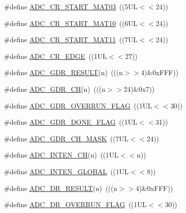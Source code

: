 \begin{DoxyCompactItemize}
\item 
\#define \hyperlink{group___a_d_c___private___macros_ga61d62f698ffa3c9772e1bea985f47e62}{\-A\-D\-C\-\_\-\-C\-R\-\_\-\-S\-T\-A\-R\-T\-\_\-\-M\-A\-T03}~((5\-U\-L$<$$<$24))
\item 
\#define \hyperlink{group___a_d_c___private___macros_ga1a95007f7fa04b41528857b1f8e065da}{\-A\-D\-C\-\_\-\-C\-R\-\_\-\-S\-T\-A\-R\-T\-\_\-\-M\-A\-T10}~((6\-U\-L$<$$<$24))
\item 
\#define \hyperlink{group___a_d_c___private___macros_gac4a508f05c04a51d3af94ab0f1686716}{\-A\-D\-C\-\_\-\-C\-R\-\_\-\-S\-T\-A\-R\-T\-\_\-\-M\-A\-T11}~((7\-U\-L$<$$<$24))
\item 
\#define \hyperlink{group___a_d_c___private___macros_ga1d05d43234dd2d1489841dff0012225e}{\-A\-D\-C\-\_\-\-C\-R\-\_\-\-E\-D\-G\-E}~((1\-U\-L$<$$<$27))
\item 
\#define \hyperlink{group___a_d_c___private___macros_ga3f3911f930878b532604b661686fdca0}{\-A\-D\-C\-\_\-\-G\-D\-R\-\_\-\-R\-E\-S\-U\-L\-T}(n)~(((n$>$$>$4)\&0x\-F\-F\-F))
\item 
\#define \hyperlink{group___a_d_c___private___macros_ga64132bfe8cebfb3b482e8f1f4ff721d7}{\-A\-D\-C\-\_\-\-G\-D\-R\-\_\-\-C\-H}(n)~(((n$>$$>$24)\&0x7))
\item 
\#define \hyperlink{group___a_d_c___private___macros_ga58a2d5a6e2743223c42a06d3f842d2cc}{\-A\-D\-C\-\_\-\-G\-D\-R\-\_\-\-O\-V\-E\-R\-R\-U\-N\-\_\-\-F\-L\-A\-G}~((1\-U\-L$<$$<$30))
\item 
\#define \hyperlink{group___a_d_c___private___macros_ga10e152dba4ccc21a6ea94a2481c51d92}{\-A\-D\-C\-\_\-\-G\-D\-R\-\_\-\-D\-O\-N\-E\-\_\-\-F\-L\-A\-G}~((1\-U\-L$<$$<$31))
\item 
\#define \hyperlink{group___a_d_c___private___macros_ga928e3f99c9f1c2515a1d9d12a0e87336}{\-A\-D\-C\-\_\-\-G\-D\-R\-\_\-\-C\-H\-\_\-\-M\-A\-S\-K}~((7\-U\-L$<$$<$24))
\item 
\#define \hyperlink{group___a_d_c___private___macros_gad30f864c531ddc1e661dfcac7d37a900}{\-A\-D\-C\-\_\-\-I\-N\-T\-E\-N\-\_\-\-C\-H}(n)~((1\-U\-L$<$$<$n))
\item 
\#define \hyperlink{group___a_d_c___private___macros_ga7b9e28e0365aae4ba24226a7b8ca7aab}{\-A\-D\-C\-\_\-\-I\-N\-T\-E\-N\-\_\-\-G\-L\-O\-B\-A\-L}~((1\-U\-L$<$$<$8))
\item 
\#define \hyperlink{group___a_d_c___private___macros_ga6e5fc80635b66a16e87c6f0eea02bb9e}{\-A\-D\-C\-\_\-\-D\-R\-\_\-\-R\-E\-S\-U\-L\-T}(n)~(((n$>$$>$4)\&0x\-F\-F\-F))
\item 
\#define \hyperlink{group___a_d_c___private___macros_gab986db68d1648ea9289e19c638bc426f}{\-A\-D\-C\-\_\-\-D\-R\-\_\-\-O\-V\-E\-R\-R\-U\-N\-\_\-\-F\-L\-A\-G}~((1\-U\-L$<$$<$30))
$$
\end{DoxyCompactItemize}
